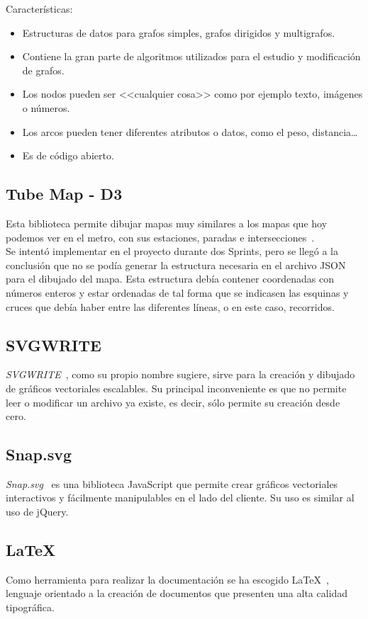 \noindent Características:
\begin{itemize}
	\item Estructuras de datos para grafos simples, grafos dirigidos y multigrafos.
	\item Contiene la gran parte de algoritmos utilizados para el estudio y modificación de grafos.
	\item Los nodos pueden ser <<cualquier cosa>> como por ejemplo texto, imágenes o números.
	\item Los arcos pueden tener diferentes atributos o datos, como el peso, distancia\dots
	\item Es de código abierto.
\end{itemize}


\subsection{Tube Map - D3}
Esta biblioteca permite dibujar mapas muy similares a los mapas que hoy podemos ver en el metro, con sus estaciones, paradas e intersecciones~\cite{doc:tubemap}.
\\
Se intentó implementar en el proyecto durante dos Sprints, pero se llegó a la conclusión que no se podía generar la estructura necesaria en el archivo JSON para el dibujado del mapa. Esta estructura debía contener coordenadas con números enteros y estar ordenadas de tal forma que se indicasen las esquinas y cruces que debía haber entre las diferentes líneas, o en este caso, recorridos.

\subsection{SVGWRITE}\label{sub:svgwrite}
\textit{SVGWRITE}~\cite{doc:svgwritedocs}, como su propio nombre sugiere, sirve para la creación y dibujado de gráficos vectoriales escalables. Su principal inconveniente es que no permite leer o modificar un archivo ya existe, es decir, sólo permite su creación desde cero.

\subsection{Snap.svg}\label{sub:snap}
\textit{Snap.svg}~\cite{doc:snapsvg} es una biblioteca JavaScript que permite crear gráficos vectoriales interactivos y fácilmente manipulables en el lado del cliente. Su uso es similar al uso de jQuery.


\subsection{\LaTeX}
Como herramienta para realizar la documentación se ha escogido \LaTeX{}~\cite{wiki:latex}, lenguaje orientado a la creación de documentos que presenten una alta calidad tipográfica.


